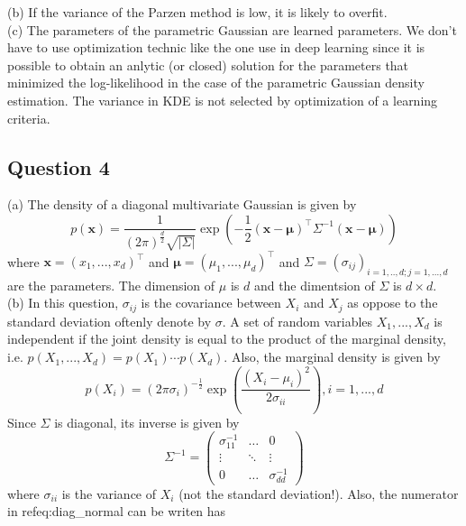 \documentclass[12pt,english]{amsart}
\theoremstyle{definition}
\begin{document}
(b) If the variance of the Parzen method is low, it is likely to overfit.\\

(c) The parameters of the parametric Gaussian are learned parameters. We don't have to use optimization technic like the one use in deep learning since it is possible to obtain an anlytic (or closed) solution for the parameters that minimized the log-likelihood in the case of the parametric Gaussian density estimation. The variance in KDE is not selected by optimization of a learning criteria.

\subsection*{Question 4}
(a) The density of a diagonal multivariate Gaussian is given by
\begin{equation}
p(\bm{x}) 
= \frac{1}{(2\pi)^\frac{d}{2}\sqrt{|\Sigma|}}
\exp\left(
   - \frac{1}{2}(\bm{x}-\bm{\mu})^\top\Sigma^{-1}(\bm{x}-\bm{\mu})
\right)
\label{eq:diag_normal}
\end{equation}
where $\bm{x}=(x_1,...,x_d)^\top $ and $\bm{\mu}=(\mu_1,...,\mu_d)^\top$ and $\Sigma=\left(\sigma_{ij}\right)_{i=1,..,d; j=1,...,d}$ are the parameters. The dimension of $\mu$ is $d$ and the dimentsion of $\Sigma$ is $d\times d$.\\

(b) In this question, $\sigma_{ij}$ is the covariance between $X_i$ and $X_j$ as oppose to the standard deviation oftenly denote by $\sigma$. A set of random variables $X_1,...,X_d$ is independent if the joint density is equal to the product of the marginal density, i.e. $p(X_1,...,X_d)=p(X_1)\cdots p(X_d)$. Also, the marginal density is given by
$$
    p(X_i) = (2\pi\sigma_i)^{-\frac{1}{2}} 
    \exp
    \left(
        \frac{(X_i-\mu_i)^2}{2\sigma_{ii}}
    \right),
    i=1,...,d
$$
Since $\Sigma$ is diagonal, its inverse is given by 
$$
    \Sigma^{-1} = 
    \begin{pmatrix}
        \sigma_{11}^{-1} & \hdots & 0 \\
        \vdots & \ddots & \vdots \\
        0 & \hdots & \sigma_{dd}^{-1}
    \end{pmatrix}
$$
where $\sigma_{ii}$ is the variance of $X_i$ (not the standard deviation!).
Also, the numerator in ref{eq:diag_normal} can be writen has
\end{document}

